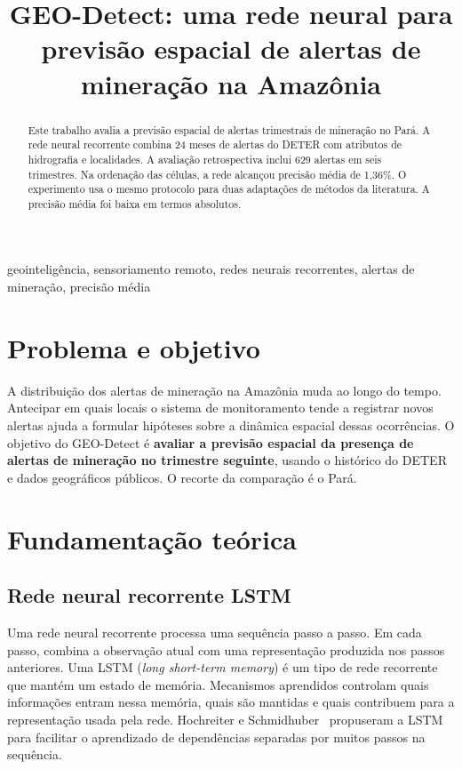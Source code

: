 \documentclass[a4paper,conference]{IEEEtran}
\title{GEO-Detect: uma rede neural para previsão espacial de alertas de mineração na Amazônia}
\author{\IEEEauthorblockN{Henrique Buzin}
\IEEEauthorblockA{Programa de Pós-Graduação em Ciência da Computação\\
Universidade Federal de Santa Catarina (UFSC)}}
\begin{document}
\maketitle

\begin{abstract}
Este trabalho avalia a previsão espacial de alertas trimestrais de mineração no Pará. A rede neural recorrente combina 24 meses de alertas do DETER com atributos de hidrografia e localidades. A avaliação retrospectiva inclui 629 alertas em seis trimestres. Na ordenação das células, a rede alcançou precisão média de 1,36\%. O experimento usa o mesmo protocolo para duas adaptações de métodos da literatura. A precisão média foi baixa em termos absolutos.
\end{abstract}

\begin{IEEEkeywords}
geointeligência, sensoriamento remoto, redes neurais recorrentes, alertas de mineração, precisão média
\end{IEEEkeywords}

\section{Problema e objetivo}

A distribuição dos alertas de mineração na Amazônia muda ao longo do tempo. Antecipar em quais locais o sistema de monitoramento tende a registrar novos alertas ajuda a formular hipóteses sobre a dinâmica espacial dessas ocorrências. O objetivo do GEO-Detect é \textbf{avaliar a previsão espacial da presença de alertas de mineração no trimestre seguinte}, usando o histórico do DETER e dados geográficos públicos. O recorte da comparação é o Pará.

\section{Fundamentação teórica}

\subsection{Rede neural recorrente LSTM}

Uma rede neural recorrente processa uma sequência passo a passo. Em cada passo, combina a observação atual com uma representação produzida nos passos anteriores. Uma LSTM (\emph{long short-term memory}) é um tipo de rede recorrente que mantém um estado de memória. Mecanismos aprendidos controlam quais informações entram nessa memória, quais são mantidas e quais contribuem para a representação usada pela rede. Hochreiter e Schmidhuber~\cite{hochreiter1997} propuseram a LSTM para facilitar o aprendizado de dependências separadas por muitos passos na sequência.
\end{document}
